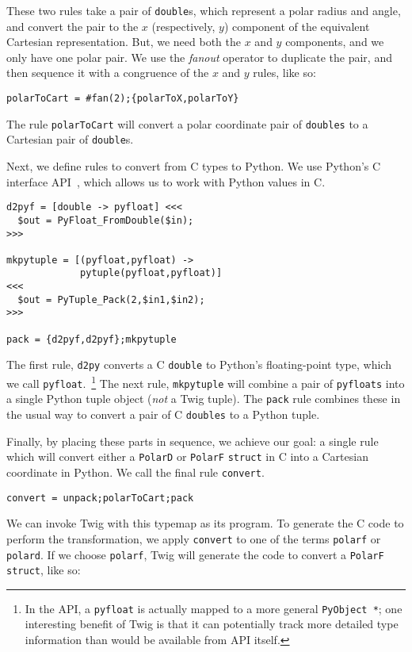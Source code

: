These two rules take a pair of \texttt{double}s, which represent a
polar radius and angle, and convert the pair to the $x$
(respectively, $y$) component of the equivalent Cartesian
representation. But, we need both the $x$ and $y$ components, and
we only have one polar pair. We use the \emph{fanout} operator to
duplicate the pair, and then sequence it with a congruence of the
$x$ and $y$ rules, like so:

\begin{verbatim}
polarToCart = #fan(2);{polarToX,polarToY}
\end{verbatim}

The rule \texttt{polarToCart} will convert a polar coordinate pair
of \texttt{doubles} to a Cartesian pair of \texttt{double}s.

Next, we define rules to convert from C types to Python. We use
Python's C interface API~\cite{python-c-api}, which allows us to
work with Python values in C.

\begin{verbatim}
d2pyf = [double -> pyfloat] <<<
  $out = PyFloat_FromDouble($in);
>>>

mkpytuple = [(pyfloat,pyfloat) -> 
             pytuple(pyfloat,pyfloat)] 
<<<
  $out = PyTuple_Pack(2,$in1,$in2);
>>>

pack = {d2pyf,d2pyf};mkpytuple
\end{verbatim}

The first rule, \texttt{d2py} converts a C \texttt{double} to
Python's floating-point type, which we call
\texttt{pyfloat}.~\footnote{In the API, a \texttt{pyfloat} is
actually mapped to a more general \texttt{PyObject *}; one
interesting benefit of Twig is that it can potentially track more
detailed type information than would be available from API
itself.} The next rule, \texttt{mkpytuple} will combine a pair of
\texttt{pyfloats} into a single Python tuple object (\emph{not} a
Twig tuple). The \texttt{pack} rule combines these in the usual
way to convert a pair of C \texttt{doubles} to a Python tuple.

Finally, by placing these parts in sequence, we achieve our goal:
a single rule which will convert either a \texttt{PolarD} or
\texttt{PolarF} \texttt{struct} in C into a Cartesian coordinate
in Python. We call the final rule \texttt{convert}.

\begin{verbatim}
convert = unpack;polarToCart;pack
\end{verbatim}

We can invoke Twig with this typemap as its program. To generate
the C code to perform the transformation, we apply
\texttt{convert} to one of the terms \texttt{polarf} or
\texttt{polard}. If we choose \texttt{polarf}, Twig will generate
the code to convert a \texttt{PolarF} \texttt{struct}, like so:

